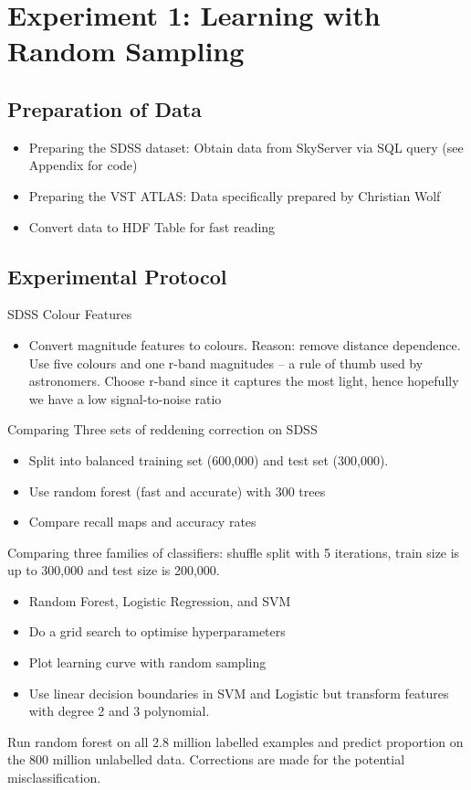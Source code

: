 
\chapter{Experiment 1: Learning with Random Sampling}
\label{cha:expt1}

\section{Preparation of Data}


\begin{itemize}
	\item Preparing the SDSS dataset:
	 Obtain data from SkyServer via SQL query (see Appendix for code)
	 \item Preparing the VST ATLAS: Data specifically prepared by Christian Wolf
	\item Convert data to HDF Table for fast reading
\end{itemize}


\section{Experimental Protocol}
\label{sec:protocol1}

SDSS Colour Features
\begin{itemize}
	\item Convert magnitude features to colours. Reason: remove distance dependence.
	Use five colours and one r-band magnitudes -- a rule of thumb used by astronomers.
	Choose r-band since it captures the most light, hence hopefully we have a low
	signal-to-noise ratio
\end{itemize}
Comparing Three sets of reddening correction on SDSS
\begin{itemize}
	\item Split into balanced training set (600,000) and test set (300,000).
	\item Use random forest (fast and accurate) with 300 trees
	\item Compare recall maps and accuracy rates
\end{itemize}
Comparing three families of classifiers: shuffle split with 5 iterations, train size is
up to 300,000 and test size is 200,000.
\begin{itemize}
	\item Random Forest, Logistic Regression, and SVM
	\item Do a grid search to optimise hyperparameters
	\item Plot learning curve with random sampling
	\item Use linear decision boundaries in SVM and Logistic but transform features with
	degree 2 and 3 polynomial.
\end{itemize}
Run random forest on all 2.8 million labelled examples and predict proportion 
on the 800 million unlabelled data. Corrections are made for the potential misclassification.



